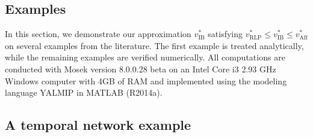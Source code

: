 \documentclass[12pt]{article}
\DeclareMathOperator{\AR}{RLP}
\DeclareMathOperator{\AP}{Aff}
\newcommand{\IB}{\mathrm{IB}}
\begin{document}
\begin{onehalfspace}
\section{Examples} \label{sec:examples}

In this section, we demonstrate our approximation $v_{\IB}^*$ satisfying
$v^*_{\AR} \le v_{\IB}^* \le v_{\AP}^*$ on several examples from the
literature. The first example is treated analytically, while the remaining
examples are verified numerically. All computations are conducted with
Mosek version 8.0.0.28 beta \cite{mosek} on an Intel Core i3 2.93 GHz Windows
computer with 4GB of RAM and implemented using the modeling language
YALMIP \cite{lofberg2004yalmip} in MATLAB (R2014a).

\subsection{A temporal network example} \label{ssec:example}


\end{onehalfspace}
\end{document}
